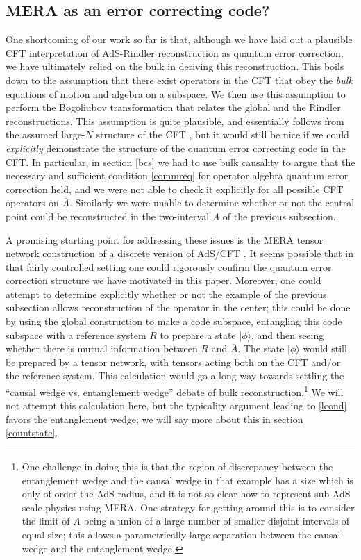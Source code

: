 \documentclass[11pt]{article}
\newcommand{\ran}{\rangle}
\newcommand{\ol}{\overline}
\begin{document}
\subsection{MERA as an error correcting code?}
One shortcoming of our work so far is that, although we have laid out a plausible CFT interpretation of AdS-Rindler reconstruction as quantum error correction, we have ultimately relied on the bulk in deriving this reconstruction.  This boils down to the assumption that there exist operators in the CFT that obey the \textit{bulk} equations of motion and algebra on a subspace.  We then use this assumption to perform the Bogoliubov transformation that relates the global and the Rindler reconstructions.  This assumption is quite plausible, and essentially follows from the assumed large-$N$ structure of the CFT \cite{Heemskerk:2009pn}, but it would still be nice if we could \textit{explicitly} demonstrate the structure of the quantum error correcting code in the CFT.  In particular, in section \ref{bcs} we had to use bulk causality to argue that the necessary and sufficient condition \eqref{commreq} for operator algebra quantum error correction held, and we were not able to check it explicitly for all possible CFT operators on $\ol{A}$.  Similarly we were unable to determine whether or not the central point could be reconstructed in the two-interval $A$ of the previous subsection.  

A promising starting point for addressing these issues is the MERA tensor network construction of a discrete version of AdS/CFT \cite{Vidal:2008zz,Swingle:2009bg,evenbly2011tensor}.  It seems possible that in that fairly controlled setting one could rigorously confirm the quantum error correction structure we have motivated in this paper.  Moreover, one could attempt to determine explicitly whether or not the example of the previous subsection allows reconstruction of the operator in the center; this could be done by using the global construction to make a code subspace, entangling this code subspace with a reference system $R$ to prepare a state $|\phi\ran$, and then seeing whether there is mutual information between $R$ and $\ol{A}$. The state $|\phi\ran$ would still be prepared by a tensor network, with tensors acting both on the CFT and/or the reference system.  This calculation would go a long way towards settling the ``causal wedge vs. entanglement wedge'' debate of bulk reconstruction.\footnote{One challenge in doing this is that the region of discrepancy between the entanglement wedge and the causal wedge in that example has a size which is only of order the AdS radius, and it is not so clear how to represent sub-AdS scale physics using MERA.  One strategy for getting around this is to consider the limit of $A$ being a union of a large number of smaller disjoint intervals of equal size; this allows a parametrically large separation between the causal wedge and the entanglement wedge.}
We will not attempt this calculation here, but the typicality argument leading to \eqref{lcond} favors the entanglement wedge; we will say more about this in section \ref{countstate}.
\end{document}
